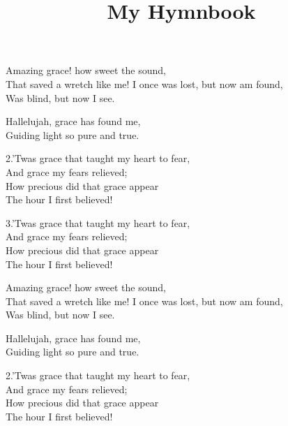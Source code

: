 \documentclass[12pt]{article}
\title{My Hymnbook}
\author{}
\date{}
\begin{document}
\maketitle
\newpage


\begin{stanza}
Amazing grace! how sweet the sound,\\
That saved a wretch like me!
I once was lost, but now am found,\\
Was blind, but now I see.
\end{stanza}

\begin{chorus}
Hallelujah, grace has found me,\\
Guiding light so pure and true.
\end{chorus}

\begin{stanza}
2.’Twas grace that taught my heart to fear,\\
And grace my fears relieved;\\
How precious did that grace appear\\
The hour I first believed!
\end{stanza}

\begin{stanza}
3.’Twas grace that taught my heart to fear,\\
And grace my fears relieved;\\
How precious did that grace appear\\
The hour I first believed!
\end{stanza}



\begin{stanza}
Amazing grace! how sweet the sound,\\
That saved a wretch like me!
I once was lost, but now am found,\\
Was blind, but now I see.
\end{stanza}

\begin{chorus}
Hallelujah, grace has found me,\\
Guiding light so pure and true.
\end{chorus}

\begin{stanza}
2.’Twas grace that taught my heart to fear,\\
And grace my fears relieved;\\
How precious did that grace appear\\
The hour I first believed!
\end{stanza}
\end{document}
